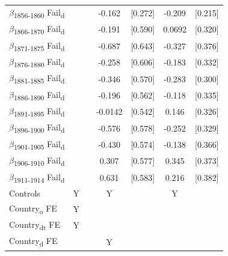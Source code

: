 {\begin{tabular}{l*{3}{cc}}
$\beta$\textsubscript{1856-1860} Fail\textsubscript{d}&               &            &      -0.162   &     [0.272]&      -0.209   &     [0.215]\\
$\beta$\textsubscript{1866-1870} Fail\textsubscript{d}&               &            &      -0.191   &     [0.590]&      0.0692   &     [0.320]\\
$\beta$\textsubscript{1871-1875} Fail\textsubscript{d}&               &            &      -0.687   &     [0.643]&      -0.327   &     [0.376]\\
$\beta$\textsubscript{1876-1880} Fail\textsubscript{d}&               &            &      -0.258   &     [0.606]&      -0.183   &     [0.332]\\
$\beta$\textsubscript{1881-1885} Fail\textsubscript{d}&               &            &      -0.346   &     [0.570]&      -0.283   &     [0.300]\\
$\beta$\textsubscript{1886-1890} Fail\textsubscript{d}&               &            &      -0.196   &     [0.562]&      -0.118   &     [0.335]\\
$\beta$\textsubscript{1891-1895} Fail\textsubscript{d}&               &            &     -0.0142   &     [0.542]&       0.146   &     [0.326]\\
$\beta$\textsubscript{1896-1900} Fail\textsubscript{d}&               &            &      -0.576   &     [0.578]&      -0.252   &     [0.329]\\
$\beta$\textsubscript{1901-1905} Fail\textsubscript{d}&               &            &      -0.430   &     [0.574]&      -0.138   &     [0.366]\\
$\beta$\textsubscript{1906-1910} Fail\textsubscript{d}&               &            &       0.307   &     [0.577]&       0.345   &     [0.373]\\
$\beta$\textsubscript{1911-1914} Fail\textsubscript{d}&               &            &       0.631   &     [0.583]&       0.216   &     [0.382]\\\hline
Controls    &           Y   &            &           Y   &            &           Y   &            \\
Country\textsubscript{o} FE&           Y   &            &               &            &               &            \\
Country\textsubscript{dt} FE&           Y   &            &               &            &               &            \\
Country\textsubscript{d} FE&               &            &           Y   &            &               &            \\

\end{tabular}}
